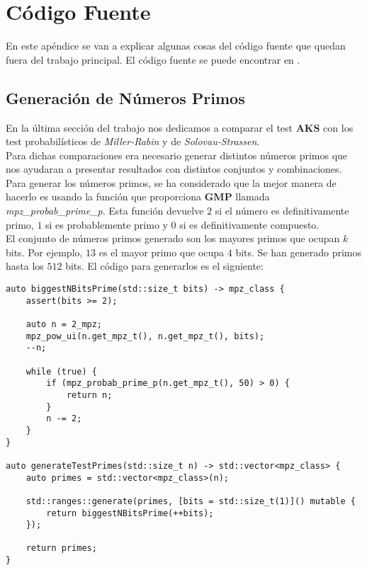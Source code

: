 
\chapter{Código Fuente}\label{codigo_fuente}

En este apéndice se van a explicar algunas cosas del código fuente que quedan fuera del trabajo principal. El código fuente se puede encontrar en \cite{fgallego_tfg_github}.

\section{Generación de Números Primos}

En la última sección del trabajo nos dedicamos a comparar el test \textbf{AKS} con los test probabilísticos de \textit{Miller-Rabin} y de \textit{Solovau-Strassen}.\\

Para dichas comparaciones era necesario generar distintos números primos que nos ayudaran a presentar resultados con distintos conjuntos y combinaciones. Para generar los números primos, se ha considerado que la mejor manera de hacerlo es usando la función que proporciona \textbf{GMP} llamada \textit{mpz\_probab\_prime\_p}. Esta función devuelve $2$ si el número es definitivamente primo, $1$ si es probablemente primo y $0$ si es definitivamente compuesto.\\

El conjunto de números primos generado son los mayores primos que ocupan $k$ bits. Por ejemplo, $13$ es el mayor primo que ocupa $4$ bits. Se han generado primos hasta los $512$ bits. El código para generarlos es el siguiente:

\begin{lstlisting}
auto biggestNBitsPrime(std::size_t bits) -> mpz_class {
	assert(bits >= 2);

	auto n = 2_mpz;
	mpz_pow_ui(n.get_mpz_t(), n.get_mpz_t(), bits);
	--n;

	while (true) {
		if (mpz_probab_prime_p(n.get_mpz_t(), 50) > 0) {
			return n;
		}
		n -= 2;
	}
}

auto generateTestPrimes(std::size_t n) -> std::vector<mpz_class> {
	auto primes = std::vector<mpz_class>(n);

	std::ranges::generate(primes, [bits = std::size_t(1)]() mutable {
		return biggestNBitsPrime(++bits);
	});

	return primes;
}
\end{lstlisting}


